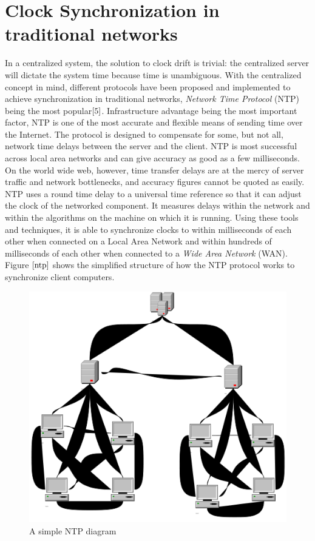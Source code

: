\documentclass[a4paper,10pt]{report}
\begin{document}
\section{\textbf{Clock Synchronization in traditional networks}}
In a centralized system, the solution to clock drift is trivial: the centralized server will dictate the system time because time is unambiguous. With the centralized concept in mind, different protocols have been proposed and implemented to achieve synchronization in traditional networks, \textit{Network Time Protocol} (NTP) being the most popular$\cite{5}$. 
\newline
Infrastructure advantage being the most important factor, NTP is one of the most accurate and flexible means of sending time over the Internet. The protocol is designed to compensate for some, but not all, network time delays between the server and the client. NTP is most successful across local area networks and can give accuracy as good as a few milliseconds. On the world wide web, however, time transfer delays are at the mercy of server traffic and network bottlenecks, and accuracy figures cannot be quoted as easily. NTP uses a round time delay to a universal time reference so that it can adjust the clock of the networked component. It measures delays within the network and within the algorithms on the machine on which it is running. Using  these tools and techniques, it is able to synchronize clocks to within milliseconds of each other when connected on a Local Area Network and within hundreds of milliseconds of each other when connected to a \textit{Wide Area Network} (WAN). Figure $\ref{ntp}$ shows the simplified structure of how the NTP protocol works to synchronize client computers.
\begin{figure}
\centering
\includegraphics[width= 0.5 \textwidth]{ntp}
\caption{A simple NTP diagram} \label{ntp}
\end{figure}
\end{document}

